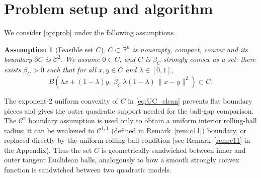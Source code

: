\documentclass{article}
\newtheorem{assumption}{Assumption}
\newcommand{\akiko}[1]{}
\begin{document}



\section{Problem setup and algorithm}\label{sec:setup}

We consider \eqref{optprob} under the following assumptions.
\begin{assumption}[Feasible set $C$]
\label{ass:C_clean}
$C\subset \mathbb R^n$ is nonempty, compact, convex and its boundary $\partial C$ is $\mathcal{C}^2$. We assume $0\in C$, and $C$ is $\beta_C$-strongly convex as a set: there exists $\beta_C>0$ such that for all $x,y\in C$ and $\lambda\in[0,1]$,
\begin{equation}
B\!\left(\lambda x+(1-\lambda)y,\ \beta_C\,\lambda(1-\lambda)\,\|x-y\|^2\right)\subset C.
\label{eq:UC_clean}
\end{equation}
\end{assumption}

The exponent-\(2\) uniform convexity of \(C\) in \eqref{eq:UC_clean} prevents flat boundary
pieces and gives the outer quadratic support needed for the ball-gap
comparison. 
The \(\mathcal{C}^2\) boundary assumption is used only to obtain a
uniform interior rolling-ball radius; it can be weakened to \(\mathcal{C}^{1,1}\) (defined in Remark~\ref{rem:c11}) boundary, or replaced directly by the uniform rolling-ball condition
(see Remark~\ref{rem:c11} in the Appendix). Thus the set \(C\) is geometrically
sandwiched between inner and outer tangent Euclidean balls, analogously to how
a smooth strongly convex function is sandwiched between two quadratic models.
\end{document}
